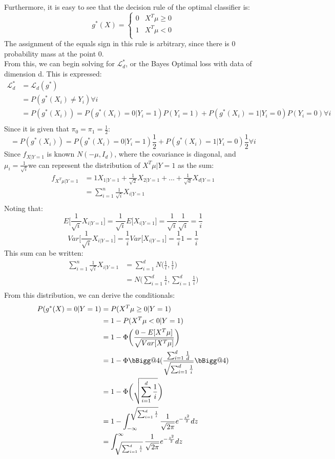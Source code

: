 \documentclass{article}
\makeatletter
\newcommand{\hella}{\bBigg@{4}}
\makeatother
\begin{document}
  Furthermore, it is easy to see that the decision rule of the optimal classifier is:
  \[g^*(X) =
    \begin{cases}
       0 & X^T\mu \geq 0\\
       1 & X^T\mu < 0\\
    \end{cases}
  \]
  The assignment of the equals sign in this rule is arbitrary, since there is $0$ probability mass at the point 0.\\[6pt]
  From this, we can begin solving for $\mathcal L_d^*$, or the Bayes Optimal loss with data of dimension d. This is expressed:
  \begin{align*}
    \mathcal L_d^* &= \mathcal L_d(g^*)\\
    &= P(g^*(X_i) \neq Y_i) \forall i\\
    &= P(g^*(X_i)) = P(g^*(X_i)=0 | Y_i=1) P(Y_i=1) + P(g^*(X_i)=1|Y_i=0)P(Y_i=0) \forall i\\
  \end{align*}
  Since it is given that $\pi_0 = \pi_1 = \frac{1}{2}$:
    $$= P(g^*(X_i)) = P(g^*(X_i)=0 | Y_i=1) \frac{1}{2} + P(g^*(X_i)=1|Y_i=0) \frac{1}{2} \forall i$$
  Since $f_{X|Y=1}$ is known $N(-\mu, I_d)$, where the covariance is diagonal, and $\mu_i = \frac{1}{\sqrt{i}}$we can represent the distribution of $X^T\mu|Y=1$ as the sum:
  \begin{align*}
    f_{X^T\mu|Y=1} &= 1X_{1|Y=1}+ \frac{1}{\sqrt{2}}X_{2|Y=1} + ... + \frac{1}{\sqrt{d}}X_{d|Y=1}\\
    &= \sum_{i=1}^n \frac{1}{\sqrt{i}}X_{i|Y=1}\\
  \end{align*}
  Noting that:
  $$E\bigg[\frac{1}{\sqrt{i}}X_{i|Y=1}\bigg] = \frac{1}{\sqrt{i}}E\bigg[X_{i|Y=1}\bigg] = \frac{1}{\sqrt{i}}\frac{1}{\sqrt{i}} = \frac{1}{i}$$
  $$Var\bigg[\frac{1}{\sqrt{i}}X_{i|Y=1}\bigg] = \frac{1}{i}Var\bigg[X_{i|Y=1}\bigg] = \frac{1}{i}1 = \frac{1}{i}$$
  This sum can be written:
  \begin{align*}
    \sum_{i=1}^n \frac{1}{\sqrt{i}}X_{i|Y=1} &= \sum_{i=1}^d N\bigg(\frac{1}{i}, \frac{1}{i}\bigg)\\
    &= N\bigg(\sum_{i=1}^d \frac{1}{i}, \sum_{i=1}^d \frac{1}{i}\bigg)\\
  \end{align*}
  From this distribution, we can derive the conditionals:
  \begin{align*}
    P(g^*(X)=0|Y=1) &= P(X^T\mu \geq 0 |Y=1)\\
    &= 1 - P(X^T\mu < 0|Y=1) \\
    &= 1 - \Phi\bigg(\frac{0 - E[X^T\mu]}{\sqrt{Var[X^T\mu]}}\bigg)\\
    &= 1 - \Phi\hella(\frac{\sum_{i=1}^d \frac{1}{d}}{\sqrt{\sum_{i=1}^d \frac{1}{i}}}\hella)\\
    &= 1 - \Phi\bigg(\sqrt{\sum_{i=1}^d \frac{1}{i}}\bigg)\\
    &= 1 - \int_{-\infty}^{\sqrt{\sum_{i=1}^d  \frac{1}{i}}} \frac{1}{\sqrt{2\pi}}e^{-\frac{z^2}{2}}dz\\
    &= \int_{\sqrt{\sum_{i=1}^d \frac{1}{i}}}^{\infty} \frac{1}{\sqrt{2\pi}}e^{-\frac{z^2}{2}}dz\\
  \end{align*}
\end{document}
